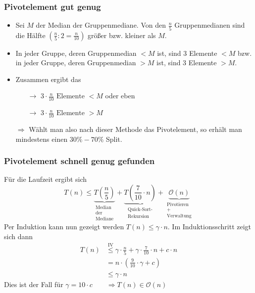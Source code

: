 \documentclass{scrartcl}%
\begin{document}
    \subsubsection*{Pivotelement gut genug}
    \begin{itemize}
        \item Sei $M$ der Median der Gruppenmediane.
        Von den $\frac{n}{5}$ Gruppenmedianen sind die Hälfte $(\frac{n}{5}:2=\frac{n}{10})$ größer bzw. kleiner als $M$.
        \item In jeder Gruppe, deren Gruppenmedian $<M$ ist, sind 3 Elemente $<M$ bzw. in jeder Gruppe, deren Gruppenmedian $>M$ ist, sind 3 Elemente $>M$.
        \item Zusammen ergibt das
        \begin{itemize}
            \item [$\rightarrow$] $3 \cdot \frac{n}{10} \text{ Elemente }<M$ oder eben
            \item [$\rightarrow$] $3 \cdot \frac{n}{10} \text{ Elemente }>M$
        \end{itemize}
        \item [$\Rightarrow$] Wählt man also nach dieser Methode das Pivotelement, so erhält man mindestens einen $30\%-70\%$ Split.
    \end{itemize}

    \subsubsection*{Pivotelement schnell genug gefunden}
    Für die Laufzeit ergibt sich
    \begin{equation*}
        T(n) \leq \underbrace{T(\dfrac{n}{5})}_{\substack{\text{Median} \\ \text{der} \\ \text{Mediane}}}
        + \underbrace{T(\dfrac{7}{10} \cdot n)}_{\substack{\text{Quick-Sort-} \\ \text{Rekursion}}}
        + \underbrace{\mathcal{O}(n)}_{\substack{\text{Pivotieren} \\ \text{+} \\ \text{Verwaltung}}}
    \end{equation*}
    Per Induktion kann nun gezeigt werden $T(n)\leq \gamma \cdot n$.
    Im Induktionsschritt zeigt sich dann
    \begin{equation*}
        \begin{flalign}
            T(n) & \overset{\text{IV}}{\leq} \gamma \cdot \frac{n}{5} + \gamma \cdot \frac{7}{10} \cdot n + c \cdot n\\\nonumber
            &= n \cdot (\frac{9}{10} \cdot \gamma + c)\\\nonumber
            &\leq \gamma \cdot n
        \end{flalign}
    \end{equation*}
    Dies ist der Fall für $\gamma = 10 \cdot c\qquad \Longrightarrow T(n) \in \mathcal{O}(n)$
\end{document}
